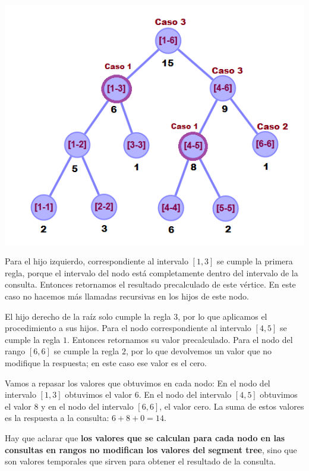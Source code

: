 \begin{minipage}{\columnwidth}
    \includegraphics[width=\linewidth]{imag/segment_tree_query_casos}
    \label{fig:example_st_casos}
\end{minipage}

Para el hijo izquierdo, correspondiente al intervalo $[1, 3]$ se cumple la primera regla, porque el intervalo del nodo est\'a completamente dentro del intervalo de la consulta. Entonces retornamos el resultado precalculado de este v\'ertice. En este caso no hacemos m\'as llamadas recursivas en los hijos de este nodo.

El hijo derecho de la ra\'iz solo cumple la regla $3$, por lo que aplicamos el procedimiento a sus hijos. Para el nodo correspondiente al intervalo $[4, 5]$ se cumple la regla $1$. Entonces retornamos su valor precalculado. Para el nodo del rango $[6, 6]$ se cumple la regla $2$, por lo que devolvemos un valor que no modifique la respuesta; en este caso ese valor es el cero. 


Vamos a repasar los valores que obtuvimos en cada nodo: En el nodo del intervalo $[1, 3]$ obtuvimos el valor $6$. En el nodo del intervalo $[4, 5]$ obtuvimos el valor $8$ y en el nodo del intervalo $[6, 6]$, el valor cero. La suma de estos valores es la respuesta a la consulta: $6 + 8 + 0 = 14$.

Hay que aclarar que \textbf{los valores que se calculan para cada nodo en las consultas en rangos no modifican los valores del segment tree}, sino que son valores temporales que sirven para obtener el resultado de la consulta. \\

